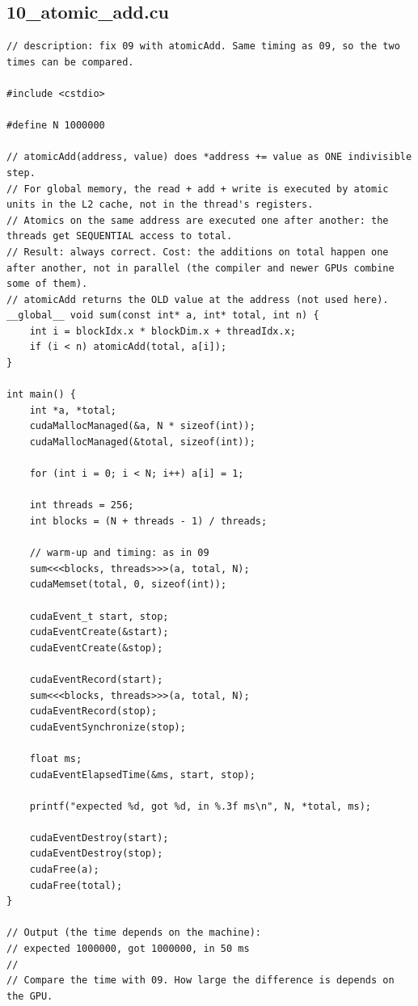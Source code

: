 \documentclass[main.tex]{subfiles}
\begin{document}
\subsection{10\_atomic\_add.cu}
\begin{lstlisting}[language=CUDA]
// description: fix 09 with atomicAdd. Same timing as 09, so the two times can be compared.

#include <cstdio>

#define N 1000000

// atomicAdd(address, value) does *address += value as ONE indivisible step.
// For global memory, the read + add + write is executed by atomic units in the L2 cache, not in the thread's registers.
// Atomics on the same address are executed one after another: the threads get SEQUENTIAL access to total.
// Result: always correct. Cost: the additions on total happen one after another, not in parallel (the compiler and newer GPUs combine some of them).
// atomicAdd returns the OLD value at the address (not used here).
__global__ void sum(const int* a, int* total, int n) {
    int i = blockIdx.x * blockDim.x + threadIdx.x;
    if (i < n) atomicAdd(total, a[i]);
}

int main() {
    int *a, *total;
    cudaMallocManaged(&a, N * sizeof(int));
    cudaMallocManaged(&total, sizeof(int));

    for (int i = 0; i < N; i++) a[i] = 1;

    int threads = 256;
    int blocks = (N + threads - 1) / threads;

    // warm-up and timing: as in 09
    sum<<<blocks, threads>>>(a, total, N);
    cudaMemset(total, 0, sizeof(int));

    cudaEvent_t start, stop;
    cudaEventCreate(&start);
    cudaEventCreate(&stop);

    cudaEventRecord(start);
    sum<<<blocks, threads>>>(a, total, N);
    cudaEventRecord(stop);
    cudaEventSynchronize(stop);

    float ms;
    cudaEventElapsedTime(&ms, start, stop);

    printf("expected %d, got %d, in %.3f ms\n", N, *total, ms);

    cudaEventDestroy(start);
    cudaEventDestroy(stop);
    cudaFree(a);
    cudaFree(total);
}

// Output (the time depends on the machine):
// expected 1000000, got 1000000, in 50 ms
//
// Compare the time with 09. How large the difference is depends on the GPU.
\end{lstlisting}
\end{document}
